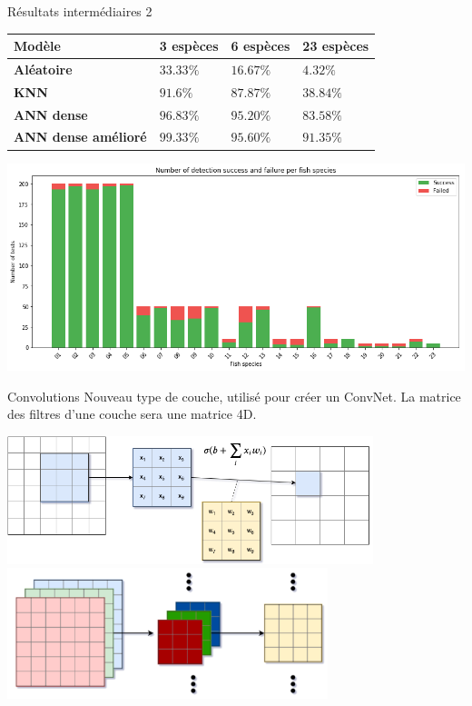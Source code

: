 \documentclass[10pt,xcolor={x11names}]{beamer}
\begin{document}
\begin{frame}{Résultats intermédiaires 2}
	\begin{tabular}{ |m{10em}|m{5.5em}|m{5.5em}|m{5.5em}| }
		\hline
		Modèle & \textbf{3 espèces} & \textbf{6 espèces} &  \textbf{23 espèces} \\
		\hline
		\textbf{Aléatoire} & $33.33\%$ & $16.67\%$ & $4.32\%$ \\
		\textbf{KNN} & $91.6\%$ & $87.87\%$ & $38.84\%$ \\
		\textbf{ANN dense} & $96.83\%$ & $95.20\%$ & $83.58\%$ \\
		\textbf{ANN dense amélioré} & $99.33\%$ & $95.60\%$ & $91.35\%$ \\
		\hline
	\end{tabular}
	\begin{center}
		\includegraphics[width=\linewidth]{dense2_results.png}
	\end{center}
	
\end{frame}

\begin{frame}{Convolutions}
	Nouveau type de couche, utilisé pour créer un ConvNet. La matrice des filtres d'une couche sera une matrice 4D.
	\begin{center}
		\includegraphics[width=0.8\textwidth]{conv_net1.png}\\
		\includegraphics[width=0.7\textwidth]{conv_channels.png}
	\end{center}
\end{frame}
\end{document}
